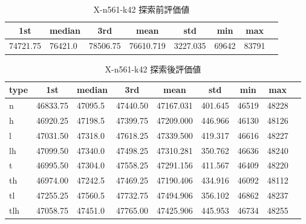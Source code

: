 \begin{table}[htbp]
    \caption{X-n561-k42 探索前評価値}
    \begin{tabular}{|l|l|l|l|l|l|l|l|}\hline
    \multicolumn{1}{|c|}{\textbf{1st}}
    &\multicolumn{1}{c|}{\textbf{median}}
    &\multicolumn{1}{c|}{\textbf{3rd}}
    &\multicolumn{1}{c|}{\textbf{mean}}
    &\multicolumn{1}{c|}{\textbf{std}}
    &\multicolumn{1}{c|}{\textbf{min}}
    &\multicolumn{1}{c|}{\textbf{max}}\\\hline
	74721.75 & 76421.0 & 78506.75 & 76610.719 & 3227.035 & 69642 & 83791\\\hline
	\end{tabular}
\end{table}
\begin{table}[htbp]
    \caption{X-n561-k42 探索後評価値}
    \begin{tabular}{|l|l|l|l|l|l|l|l|l|}\hline
    \multicolumn{1}{|c|}{\textbf{type}}
    &\multicolumn{1}{|c|}{\textbf{1st}}
    &\multicolumn{1}{c|}{\textbf{median}}
    &\multicolumn{1}{c|}{\textbf{3rd}}
    &\multicolumn{1}{c|}{\textbf{mean}}
    &\multicolumn{1}{c|}{\textbf{std}}
    &\multicolumn{1}{c|}{\textbf{min}}
    &\multicolumn{1}{c|}{\textbf{max}}\\\hline
	n & 46833.75 & 47095.5 & 47440.50 & 47167.031 & 401.645 & 46519 & 48228\\\hline
	h & 46920.25 & 47198.5 & 47399.75 & 47209.000 & 446.966 & 46130 & 48126\\\hline
	l & 47031.50 & 47318.0 & 47618.25 & 47339.500 & 419.317 & 46616 & 48227\\\hline
	lh & 47099.50 & 47340.0 & 47498.25 & 47310.281 & 350.762 & 46636 & 48240\\\hline
	t & 46995.50 & 47304.0 & 47558.25 & 47291.156 & 411.567 & 46409 & 48220\\\hline
	th & 46974.00 & 47242.5 & 47469.25 & 47190.406 & 434.916 & 46092 & 48112\\\hline
	tl & 47255.25 & 47560.5 & 47732.75 & 47494.906 & 356.102 & 46862 & 48237\\\hline
	tlh & 47058.75 & 47451.0 & 47765.00 & 47425.906 & 445.953 & 46734 & 48255\\\hline
	\end{tabular}
\end{table}
